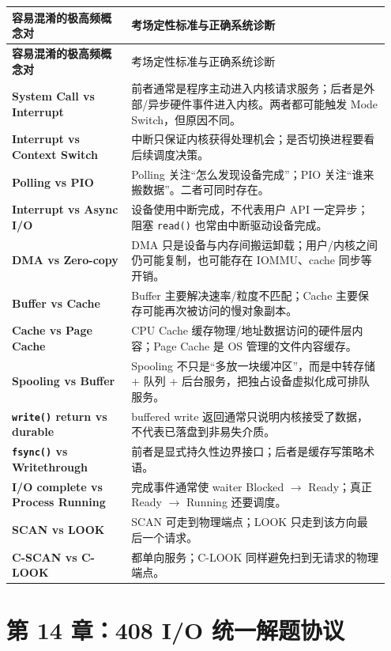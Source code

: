 \documentclass[11pt,a4paper]{ctexart}
\newcommand{\code}[1]{\texttt{#1}}
\begin{document}
\begingroup
\small
\renewcommand{\arraystretch}{1.25}
\begin{longtable}{>{\bfseries}p{0.3\linewidth} p{0.65\linewidth}}
\toprule
容易混淆的极高频概念对 & 考场定性标准与正确系统诊断 \\
\midrule
\endfirsthead
\toprule
容易混淆的极高频概念对 & 考场定性标准与正确系统诊断 \\
\midrule
\endhead
System Call vs Interrupt & 前者通常是程序主动进入内核请求服务；后者是外部/异步硬件事件进入内核。两者都可能触发 Mode Switch，但原因不同。\\
Interrupt vs Context Switch & 中断只保证内核获得处理机会；是否切换进程要看后续调度决策。\\
Polling vs PIO & Polling 关注“怎么发现设备完成”；PIO 关注“谁来搬数据”。二者可同时存在。\\
Interrupt vs Async I/O & 设备使用中断完成，不代表用户 API 一定异步；阻塞 \code{read()} 也常由中断驱动设备完成。\\
DMA vs Zero-copy & DMA 只是设备与内存间搬运卸载；用户/内核之间仍可能复制，也可能存在 IOMMU、cache 同步等开销。\\
Buffer vs Cache & Buffer 主要解决速率/粒度不匹配；Cache 主要保存可能再次被访问的慢对象副本。\\
Cache vs Page Cache & CPU Cache 缓存物理/地址数据访问的硬件层内容；Page Cache 是 OS 管理的文件内容缓存。\\
Spooling vs Buffer & Spooling 不只是“多放一块缓冲区”，而是中转存储 + 队列 + 后台服务，把独占设备虚拟化成可排队服务。\\
\code{write()} return vs durable & buffered write 返回通常只说明内核接受了数据，不代表已落盘到非易失介质。\\
\code{fsync()} vs Writethrough & 前者是显式持久性边界接口；后者是缓存写策略术语。\\
I/O complete vs Process Running & 完成事件通常使 waiter Blocked $\rightarrow$ Ready；真正 Ready $\rightarrow$ Running 还要调度。\\
SCAN vs LOOK & SCAN 可走到物理端点；LOOK 只走到该方向最后一个请求。\\
C-SCAN vs C-LOOK & 都单向服务；C-LOOK 同样避免扫到无请求的物理端点。\\
\bottomrule
\end{longtable}
\endgroup

\section{第 14 章：408 I/O 统一解题协议}
\end{document}
